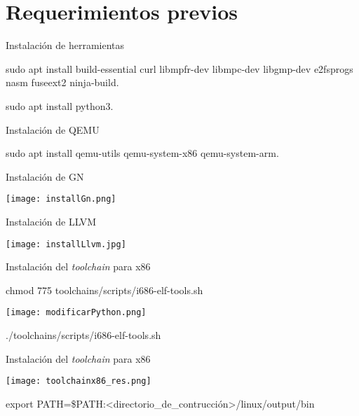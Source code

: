 \section{Requerimientos previos}
\begin{frame}{Instalación de herramientas}
	\begin{center}
		\ttfamily
		sudo apt install build-essential curl libmpfr-dev libmpc-dev libgmp-dev e2fsprogs nasm fuseext2 ninja-build.
	\end{center}

	\begin{center}
		\ttfamily
		sudo apt install python3.
	\end{center}
	
\end{frame}

\begin{frame}{Instalación de QEMU}
	
	\begin{center}
		\ttfamily
		sudo apt install qemu-utils qemu-system-x86 qemu-system-arm.
	\end{center}
\end{frame}

\begin{frame}{Instalación de GN}
	\begin{center}
		\texttt{[image: installGn.png]}
	\end{center}
\end{frame}

\begin{frame}{Instalación de LLVM}
	\begin{center}
		\texttt{[image: installLlvm.jpg]}
	\end{center}
\end{frame}

\begin{frame}{Instalación del \textit{toolchain} para x86}
	\begin{center}
		\ttfamily
		chmod 775 toolchains/scripts/i686-elf-tools.sh
		
		\enter
		
		\texttt{[image: modificarPython.png]}
		
		\enter
		
		./toolchains/scripts/i686-elf-tools.sh
	\end{center}
\end{frame}

\begin{frame}{Instalación del \textit{toolchain} para x86}
	\begin{center}
		\texttt{[image: toolchainx86\_res.png]}
		
		\enter
		
		\ttfamily
		export PATH=\$PATH:<directorio\_de\_contrucción>/linux/output/bin
	\end{center}
\end{frame}


